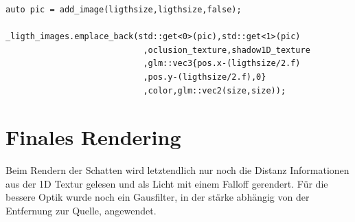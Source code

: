 \begin{lstlisting}
auto pic = add_image(ligthsize,ligthsize,false);

_ligth_images.emplace_back(std::get<0>(pic),std::get<1>(pic)
							,oclusion_texture,shadow1D_texture
							,glm::vec3{pos.x-(ligthsize/2.f)
							,pos.y-(ligthsize/2.f),0}
							,color,glm::vec2(size,size));
\end{lstlisting}

\section{Finales Rendering}
Beim Rendern der Schatten wird letztendlich nur noch die Distanz Informationen aus der 1D Textur gelesen und als Licht mit einem Falloff gerendert. Für die bessere Optik wurde noch ein Gausfilter, in der stärke abhängig von der Entfernung zur Quelle, angewendet.

